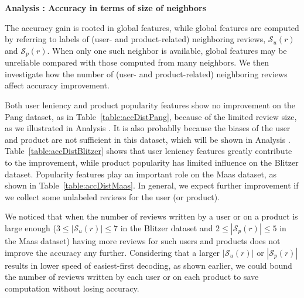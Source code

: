 \documentclass[english]{jnlp_1.4}
\begin{document}
\noindent
\textbf{Analysis {}: Accuracy in terms of size of neighbors}

The accuracy gain is rooted in global features, while global features are computed by referring to labels of (user- and product-related) neighboring reviews, $\mathcal{S}_u(r)$ and $\mathcal{S}_p(r)$.
When only one such neighbor is available, global features may be unreliable compared with those computed from many neighbors.  
We then investigate how the number of (user- and product-related) neighboring reviews affect accuracy improvement.

Both user leniency and product popularity features show no improvement on the Pang dataset, as in Table~\ref{table:accDistPang}, because of the limited review size, as we illustrated in Analysis {}.
It is also probablly because the biases of the user and product are not sufficient in this dataset, which  will be shown in Analysis {}.
Table~\ref{table:accDistBlitzer} shows that user leniency features greatly contribute to the improvement, while product popularity has limited influence on the Blitzer dataset.
Popularity features play an important role on the Maas dataset, as shown in Table~\ref{table:accDistMaas}.
In general, we expect further improvement if we collect some unlabeled reviews for the user (or product).

We noticed that when the number of reviews written by a user or on a product is large enough ($3\leq|\mathcal{S}_u(r)|\leq7$ in the Blitzer dataset and $2\leq|\mathcal{S}_p(r)|\leq5$ in the Maas dataset) having more reviews for such users and products does not improve the accuracy any further. 
Considering that a larger $|\mathcal{S}_u(r)|$ or $|\mathcal{S}_p(r)|$ results in lower speed of easiest-first decoding, as shown earlier, we could bound the number of reviews written by each user or on each product to save computation without losing accuracy.
\end{document}
